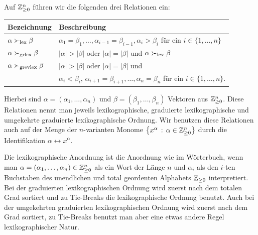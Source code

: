 \documentclass[11pt]{article}
\numberwithin{equation}{section}
\begin{document}
\begin{definition} 
	Auf $\mathbb{Z}_{\ge 0}^n$ führen wir die folgenden drei Relationen ein: 
	\begin{center} 
		\renewcommand{\arraystretch}{1.5} 
	\begin{tabular}{l|l} 
		Bezeichnung  & Beschreibung 
		\\ \hline \hline $\alpha \succ_{\operatorname{lex}} \beta$ & $\alpha_1 = \beta_1,\ldots, \alpha_{i-1}=\beta_{i-1}, \alpha_i > \beta_i$ für ein $i \in \{1,\ldots,n\}$
		\\ \hline $\alpha \succ_{\operatorname{grlex}} \beta$ & $|\alpha| > |\beta|$ oder $|\alpha| = |\beta|$ und $\alpha \succ_{\operatorname{lex}} \beta$
		\\ \hline $\alpha \succ_{\operatorname{grevlex}} \beta$ & $|\alpha| > | \beta|$ oder $|\alpha|=|\beta|$ und 
		\\ & { \color{red} $\alpha_i < \beta_i$}, $ \alpha_{i+1} = \beta_{i+1},\ldots, \alpha_n =\beta_n$ für ein $i \in \{1,\ldots,n\}$. 
	\end{tabular} 
	\end{center} 
	Hierbei sind $\alpha = (\alpha_1,\ldots,\alpha_n)$ und $\beta= (\beta_1,\ldots,\beta_n)$ Vektoren aus $\mathbb{Z}_{\ge 0}^n$. 
	Diese Relationen nennt man jeweils lexikographische, graduierte lexikographische und umgekehrte graduierte lexikographische Ordnung. 
	Wir benutzen diese Relationen auch auf der Menge der $n$-varianten Monome $\left\{  x^\alpha \,:\,  \alpha \in \mathbb{Z}_{\ge 0}^n \right\}$ durch die Identifikation $\alpha \leftrightarrow x^\alpha$. 
\end{definition}

Die lexikographische Anordnung ist die Anordnung wie im Wörterbuch, wenn man $\alpha = (\alpha_1,\ldots,\alpha_n) \in \mathbb{Z}_{\ge 0}^n$ als ein Wort der Länge $n$ und $\alpha_i$ als den $i$-ten Buchstaben des unendlichen und total geordenten Alphabets $\mathbb{Z}_{\ge 0}$ interpretiert.  Bei der graduierten lexikographischen Ordnung wird zuerst nach dem totalen Grad sortiert und zu Tie-Breaks die lexikographische Ordnung benutzt. Auch bei der umgekehrten graduierten lexikographischen Ordnung wird zuerst nach dem Grad sortiert, zu Tie-Breaks benutzt man aber eine etwas andere Regel lexikographischer Natur. 
\end{document}
